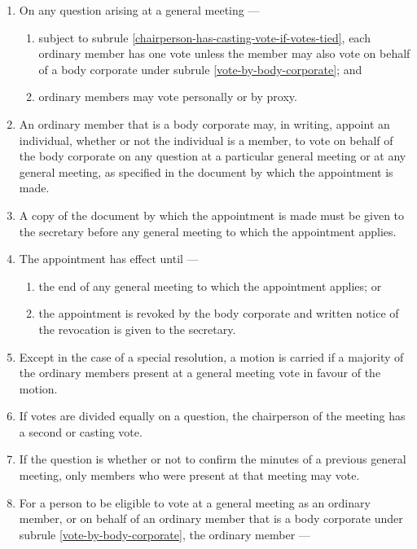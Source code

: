 \documentclass[../constitution.tex]{subfiles}
\begin{document}
\begin{enumerate}

\item On any question arising at a general meeting ---

  \begin{enumerate}
  
  \item subject to subrule \ref{chairperson-has-casting-vote-if-votes-tied}, each ordinary member has one vote unless the member may also vote on behalf of a body corporate under subrule \ref{vote-by-body-corporate}; and
  \item ordinary members may vote personally or by proxy.
  \end{enumerate}
\item \label{vote-by-body-corporate} An ordinary member that is a body corporate may, in writing, appoint an individual, whether or not the individual is a member, to vote on behalf of the body corporate on any question at a particular general meeting or at any general meeting, as specified in the document by which the appointment is made. 
\item A copy of the document by which the appointment is made must be given to the secretary before any general meeting to which the appointment applies.
\item The appointment has effect until ---
\begin{enumerate}
  \item the end of any general meeting to which the appointment applies; or
  \item the appointment is revoked by the body corporate and written notice of the revocation is given to the secretary.
\end{enumerate}
\item Except in the case of a special resolution, a motion is carried if a majority of the ordinary members present at a general meeting vote in favour of the motion.
\item If votes are divided equally on a question, the chairperson of the meeting has a second or casting vote. \label{chairperson-has-casting-vote-if-votes-tied}
\item If the question is whether or not to confirm the minutes of a previous general meeting, only members who were present at that meeting may vote.
\item \label{member-cannot-vote-with-debts} For a person to be eligible to vote at a general meeting as an ordinary member, or on behalf of an ordinary member that is a body corporate under subrule \ref{vote-by-body-corporate}, the ordinary member ---


\end{enumerate}
\end{document}
